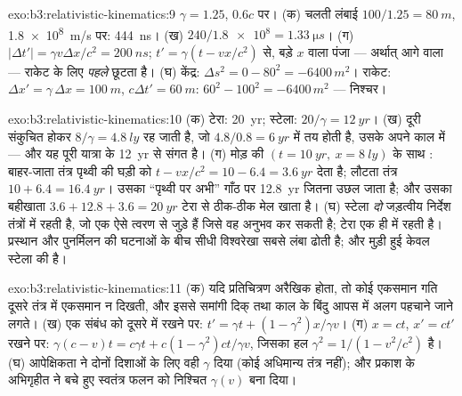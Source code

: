 \begin{solution}{exo:b3:relativistic-kinematics:9}
$\gamma = 1.25$, $0.6c$ पर। (क) चलती लंबाई $100/1.25 = \qty{80}{m}$,
\qty{1.8e8}{m/s} पर: \qty{444}{ns}। (ख) $240/\num{1.8e8} =
\qty{1.33}{\micro s}$। (ग) $|\Delta t'| = \gamma v\Delta x/c^2 =
\qty{200}{ns}$; $t' = \gamma(t - vx/c^2)$ से, बड़े $x$ वाला पंजा
--- अर्थात् आगे वाला --- राकेट के लिए \emph{पहले} छूटता है। (घ)
केंद्र: $\Delta s^2 = 0 - 80^2 = -6400\,\unit{m^2}$। राकेट: $\Delta
x' = \gamma\,\Delta x = \qty{100}{m}$, $c\Delta t' = \qty{60}{m}$:
$60^2 - 100^2 = -6400\,\unit{m^2}$ --- निश्चर।
\end{solution}

\begin{solution}{exo:b3:relativistic-kinematics:10}
(क) टेरा: \qty{20}{yr}; स्टेला: $20/\gamma = \qty{12}{yr}$। (ख)
दूरी संकुचित होकर $8/\gamma = \qty{4.8}{ly}$ रह जाती है, जो $4.8/0.8
= \qty{6}{yr}$ में तय होती है, उसके अपने काल में --- और यह पूरी यात्रा
के \qty{12}{yr} से संगत है। (ग) मोड़ की  $(t =
\qty{10}{yr},\ x = \qty{8}{ly})$ के साथ : बाहर-जाता तंत्र
पृथ्वी की घड़ी को $t - vx/c^2 = 10 - 6.4 = \qty{3.6}{yr}$ देता है;
लौटता तंत्र $10 +
6.4 = \qty{16.4}{yr}$। उसका ``पृथ्वी पर अभी'' गाँठ पर \qty{12.8}{yr}
जितना उछल जाता है; और उसका बहीखाता $3.6 + 12.8 + 3.6 = \qty{20}{yr}$
टेरा से ठीक-ठीक मेल खाता है। (घ) स्टेला \emph{दो} जड़त्वीय निर्देश
तंत्रों में रहती है, जो एक ऐसे त्वरण से जुड़े हैं जिसे वह अनुभव कर
सकती है; टेरा एक ही में रहती है। प्रस्थान और पुनर्मिलन की घटनाओं के
बीच सीधी विश्वरेखा सबसे लंबा  ढोती है; और मुड़ी हुई केवल स्टेला
की है।
\end{solution}

\begin{solution}{exo:b3:relativistic-kinematics:11}
(क) यदि प्रतिचित्रण अरैखिक होता, तो कोई एकसमान गति दूसरे तंत्र में
एकसमान न दिखती, और इससे समांगी दिक् तथा काल के बिंदु आपस में अलग पहचाने
जाने लगते। (ख) एक संबंध को दूसरे में रखने पर: $t' = \gamma t +
(1 - \gamma^2)x/\gamma v$। (ग) $x = ct$, $x' = ct'$ रखने पर:
$\gamma(c - v)t = c\gamma t + c(1 - \gamma^2)ct/\gamma v$, जिसका हल
$\gamma^2 = 1/(1 - v^2/c^2)$ है। (घ) आपेक्षिकता ने दोनों दिशाओं के
लिए वही $\gamma$ दिया (कोई अधिमान्य तंत्र नहीं); और प्रकाश के
अभिगृहीत ने बचे हुए स्वतंत्र फलन को निश्चित
$\gamma(v)$ बना दिया।
\end{solution}


